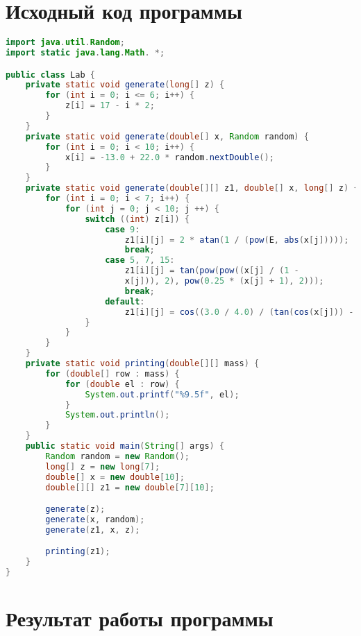 \section{Исходный код программы}
\normalsize
\begin{lstlisting}[caption={Исходный код программы}, language=Java, captionpos=b]
import java.util.Random;
import static java.lang.Math. *;

public class Lab {
    private static void generate(long[] z) {
        for (int i = 0; i <= 6; i++) {
            z[i] = 17 - i * 2;
        }
    }
    private static void generate(double[] x, Random random) {
        for (int i = 0; i < 10; i++) {
            x[i] = -13.0 + 22.0 * random.nextDouble(); 
        }
    }
    private static void generate(double[][] z1, double[] x, long[] z) {
        for (int i = 0; i < 7; i++) {
            for (int j = 0; j < 10; j ++) {
                switch ((int) z[i]) { 
                    case 9:
                        z1[i][j] = 2 * atan(1 / (pow(E, abs(x[j]))));
                        break;
                    case 5, 7, 15:
                        z1[i][j] = tan(pow(pow((x[j] / (1 - 
                        x[j])), 2), pow(0.25 * (x[j] + 1), 2)));
                        break;
                    default:
                        z1[i][j] = cos((3.0 / 4.0) / (tan(cos(x[j])) - 1));
                }
            }
        }
    }
    private static void printing(double[][] mass) {
        for (double[] row : mass) {
            for (double el : row) {
                System.out.printf("%9.5f", el); 
            }
            System.out.println();
        }
    }
    public static void main(String[] args) {
        Random random = new Random(); 
        long[] z = new long[7]; 
        double[] x = new double[10];
        double[][] z1 = new double[7][10];

        generate(z); 
        generate(x, random);
        generate(z1, x, z);

        printing(z1);
    }
}
\end{lstlisting}

\section{Результат работы программы}
